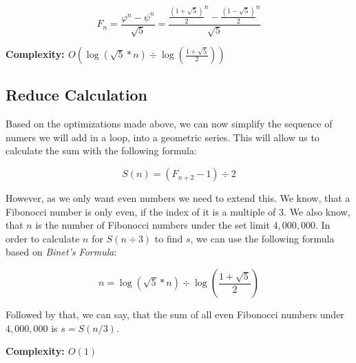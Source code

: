 \documentclass[12pt,notitlepage]{article}
\begin{document}
  $$F_{n} = \frac{\varphi^{n} - \psi^{n}}{\sqrt{5}} = \frac{
    \frac{
      (1 + \sqrt{5})
    }
    {2}^{n} -
    \frac{
      (1 - \sqrt{5})
    }
    {2}^{n}
  }{
    \sqrt{5}
  }$$\par

  \textbf{Complexity: $O(\log (\sqrt{5} * n) \div \log (\frac{1 + \sqrt{5}}{2}))$}

  \subsection{Reduce Calculation}
  Based on the optimizations made above, we can now simplify the sequence of numers we will add in a loop, into
  a geometric series. This will allow us to calculate the sum with the following formula:

  $$S(n) = (F_{n + 2} - 1) \div 2$$

  However, as we only want even numbers we need to extend this. We know, that a Fibonocci number is only even, if the
  index of it is a multiple of $3$. We also know, that $n$ is the number of Fibonocci numbers under the set limit $4,000,000$.
  In order to calculate $n$ for $S(n \div 3)$ to find $s$, we can use the following formula based on \textit{Binet's Formula}:

  $$n = \log(\sqrt{5} * n) \div \log(\frac{1 + \sqrt{5}}{2})$$

  Followed by that, we can say, that the sum of all even Fibonocci numbers under $4,000,000$ is $s = S(n / 3)$.

  \textbf{Complexity: $O(1)$}
\end{document}
